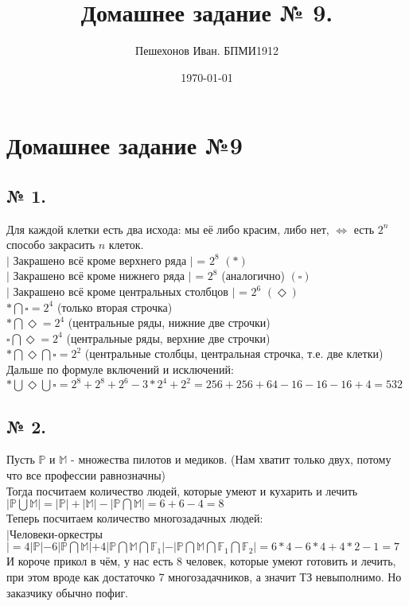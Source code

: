 \documentclass[a4paper,11pt]{report}
\title{Домашнее задание № 9.}
\author{Пешехонов Иван. БПМИ1912}
\date{\today}
\begin{document}
\chapter{Домашнее задание №9}
\section{№ 1.}
Для каждой клетки есть два исхода: мы её либо красим, либо нет, $\Leftrightarrow$ есть $2^n$ способо закрасить $n$ клеток.\\
$|$ Закрашено всё кроме верхнего ряда $|$ = $2^8$ $(*)$\\
$|$ Закрашено всё кроме нижнего ряда $|$ = $2^8$ (аналогично) $(\square)$\\
$|$ Закрашено всё кроме центральных столбцов $|$ = $2^6$ $(\Diamond)$\\
$* \bigcap \square = 2^4$ (только вторая строчка)\\
$* \bigcap \Diamond = 2^4$ (центральные ряды, нижние две строчки)\\
$\square \bigcap \Diamond = 2^4$ (центральные ряды, верхние две строчки)\\
$* \bigcap \Diamond \bigcap \square = 2^2$ (центральные столбцы, центральная строчка, т.е. две клетки)\\
Дальше по формуле включений и исключений:\\
$* \bigcup \Diamond \bigcup \square = 2^8 +2^8 + 2^6 - 3 * 2^4 + 2^2 
= 256 + 256 + 64 - 16 - 16 - 16 + 4 = 532$\\
\section{№ 2.}
Пусть $\mathbb{P}$ и $\mathbb{M}$ - множества пилотов и медиков. 
(Нам хватит только двух, потому что все профессии равнозначны)\\
Тогда посчитаем количество людей, которые умеют и кухарить и лечить\\
$|\mathbb{P} \bigcup \mathbb{M}| = |\mathbb{P}| + |\mathbb{M}| - |\mathbb{P} \bigcap \mathbb{M}| = 6 + 6 - 4 = 8$\\
Теперь посчитаем количество многозадачных людей:\\
$|$Человеки-оркестры$| = 4|\mathbb{P}| - 6|\mathbb{P} \bigcap \mathbb{M}| + 
4|\mathbb{P} \bigcap \mathbb{M} \bigcap \mathbb{F}_1| - 
|\mathbb{P} \bigcap \mathbb{M} \bigcap \mathbb{F}_1 \bigcap \mathbb{F}_2| =
6 * 4 - 6 * 4 + 4*2 - 1 = 7$\\
И короче прикол в чём, у нас есть 8 человек, которые умеют готовить и лечить, 
при этом вроде как достаточко 7 многозадачников, а значит ТЗ невыполнимо.
Но заказчику обычно пофиг.
\end{document}
